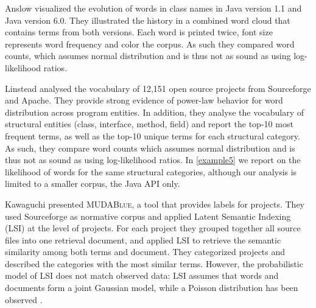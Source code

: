 
Anslow \etal \cite{Anslow08OOPSLA} visualized the evolution of words in class names in Java version 1.1 and Java version 6.0. They illustrated the history in a combined word cloud that contains terms from both versions. Each word is printed twice, font size represents word frequency and color the corpus. As such they compared word counts, which assumes normal distribution and is thus not as sound as using log-likelihood ratios.
 
Linstead \etal \cite{Linstead09SUITE} analysed the vocabulary of 12,151 open source projects from Sourceforge and Apache. They provide strong evidence of power-law behavior for word distribution across program entities. In addition, they analyse the vocabulary of structural entities (class, interface, method, field) and report the top-10 most frequent terms, as well as the top-10 unique terms for each structural category. As such, they compare word counts which assumes normal distribution and is thus not as sound as using log-likelihood ratios. In \autoref{example5} we report on the likelihood of words for the same structural categories, although our analysis is limited to a smaller corpus, \ie the Java API only.

Kawaguchi \etal \cite{Kawa04a} presented \textsc{MUDABlue}, a tool that provides labels for projects. They used Sourceforge as normative corpus and applied Latent Semantic Indexing (LSI) at the level of projects.
For each project they grouped together all source files into one retrieval document, and applied LSI to retrieve the semantic similarity among both terms and document.
They categorized projects and described the categories with the most similar terms. However, the probabilistic model of LSI does not match observed data: LSI assumes that words and documents form a joint Gaussian model, while a Poisson distribution has been observed \cite{Hofmann99PLSA}.

